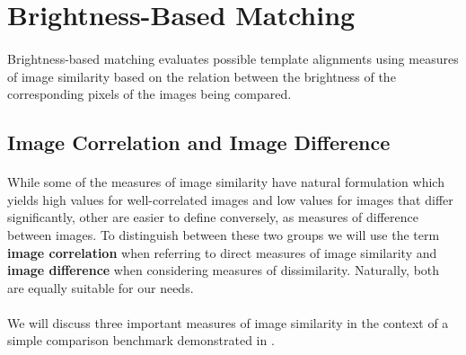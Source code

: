 \section{Brightness-Based Matching}

\paragraph*{}
Brightness-based matching evaluates possible template alignments using measures of image similarity based on the relation between the brightness of the corresponding pixels of the images being compared.

\subsection{Image Correlation and Image Difference}

\paragraph*{}
While some of the measures of image similarity have natural formulation which yields high values for well-correlated images and low values for images that differ significantly, other are easier to define conversely, as measures of difference between images. To distinguish between these two groups we will use the term \textbf{image correlation} when referring to direct measures of image similarity and \textbf{image difference} when considering measures of dissimilarity. Naturally, both are equally suitable for our needs.

\paragraph*{}
We will discuss three important measures of image similarity in the context of a simple comparison benchmark demonstrated in .

